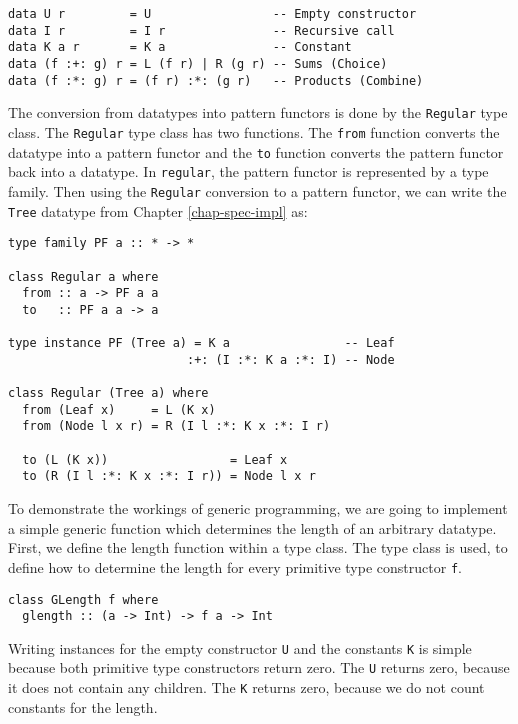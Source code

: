 \begin{verbatim}
data U r         = U                 -- Empty constructor
data I r         = I r               -- Recursive call
data K a r       = K a               -- Constant
data (f :+: g) r = L (f r) | R (g r) -- Sums (Choice)
data (f :*: g) r = (f r) :*: (g r)   -- Products (Combine)
\end{verbatim}

The conversion from datatypes into pattern functors is done by the \texttt{Regular} type class. The \texttt{Regular} type class has two functions. The \texttt{from} function converts the datatype into a pattern functor and the \texttt{to} function converts the pattern functor back into a datatype. In \texttt{regular}, the pattern functor is represented by a type family. Then using the \texttt{Regular} conversion to a pattern functor, we can write the \texttt{Tree} datatype from Chapter \ref{chap-spec-impl} as:

\begin{verbatim}
type family PF a :: * -> *

class Regular a where
  from :: a -> PF a a
  to   :: PF a a -> a

type instance PF (Tree a) = K a                -- Leaf
                         :+: (I :*: K a :*: I) -- Node

class Regular (Tree a) where
  from (Leaf x)     = L (K x)
  from (Node l x r) = R (I l :*: K x :*: I r)                 

  to (L (K x))                 = Leaf x
  to (R (I l :*: K x :*: I r)) = Node l x r
\end{verbatim}

To demonstrate the workings of generic programming, we are going to implement a simple generic function which determines the length of an arbitrary datatype. First, we define the length function within a type class. The type class is used, to define how to determine the length for every primitive type constructor \texttt{f}. 

\begin{verbatim}
class GLength f where
  glength :: (a -> Int) -> f a -> Int
\end{verbatim}

Writing instances for the empty constructor \texttt{U} and the constants \texttt{K} is simple because both primitive type constructors return zero. The \texttt{U} returns zero, because it does not contain any children. The \texttt{K} returns zero, because we do not count constants for the length. 

